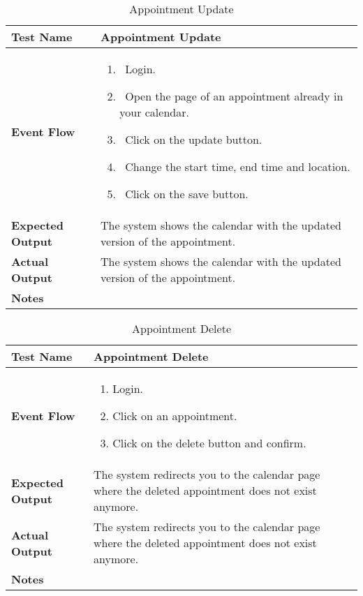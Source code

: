 \begin{table}[h]	
\centering
\def\arraystretch{1.5}
\begin{tabular}{|m{7cm}|m{7cm}|}
	\hline
	\textbf{Test Name}            &  Appointment Update  \\ \hline
	\textbf{Event Flow}             & 
		\begin{enumerate}
			\item~Login.
			\item~Open the page of an appointment already in your calendar.
			\item~Click on the update button.
			\item~Change the start time, end time and location.
			\item~Click on the save button.
		\end{enumerate}
	\\ \hline
	\textbf{Expected Output}  &  The system shows the calendar with the updated version of the appointment.   \\ \hline
	\textbf{Actual Output}       &  The system shows the calendar with the updated version of the appointment.   \\ \hline
	\textbf{Notes} & \\ \hline
\end{tabular}
\caption{Appointment Update}
\end{table}


\begin{table}[h]	
	\centering
	\def\arraystretch{1.5}
	\begin{tabular}{|m{7cm}|m{7cm}|}
		\hline
		\textbf{Test Name}            & Appointment Delete   \\ \hline
		\textbf{Event Flow}             & 
		\begin{enumerate}
			\item Login.
			\item Click on an appointment.
			\item Click on the delete button and confirm.
		\end{enumerate} \\ \hline
		\textbf{Expected Output}  &  The system redirects you to the calendar page where the deleted appointment does not exist anymore.  \\ \hline
		\textbf{Actual Output}       & The system redirects you to the calendar page where the deleted appointment does not exist anymore.    \\ \hline
		\textbf{Notes} & \\ \hline
	\end{tabular}
	\caption{Appointment Delete}
\end{table}


